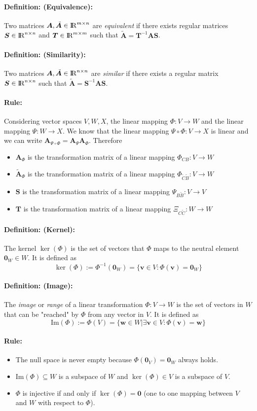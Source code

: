 \documentclass[12pt]{article}
\newcommand{\R}{{\rm I\!R}}
\newcommand{\A}{{\bm{A}}}
\newcommand{\xdefinition}[2]{\paragraph{\colorbox{#1!30}{\textbf{Definition:}} (#2):}}
\newcommand{\xrule}[1]{\paragraph{\colorbox{#1!30}{\textbf{Rule:}}}}
\begin{document}
\xdefinition{blue}{Equivalence} Two matrices $\A, \tilde{\A} \in \R^{m \times n}$ are \textit{equivalent} if there exists regular matrices $\bm{S} \in \R^{n \times n}$ and $\bm{T} \in \R^{m \times m}$ such that $\tilde{\bm{A}} = \bm{T}^{-1} \A \bm{S}$.

\xdefinition{blue}{Similarity} Two matrices $\A, \tilde{\A} \in \R^{n \times n}$ are \textit{similar} if there exists a regular matrix $\bm{S} \in \R^{n \times n}$ such that $\tilde{\bm{A}} = \bm{S}^{-1} \A \bm{S}$. 

\xrule{red} Considering vector spaces $V, W, X$, the linear mapping $\Phi : V \rightarrow W$ and the linear mapping $\Psi : W \rightarrow X$. We know that the linear mapping $\Psi \circ \Phi : V \rightarrow X$ is linear and we can write $\A_{\Psi \circ \Phi} = \A_\Psi \A_\Phi$. Therefore
%
\begin{itemize}
	\item $\A_\Phi$ is the transformation matrix of a linear mapping $\Phi_{CB} : V \rightarrow W$
	\item $\tilde{\A}_\Phi$ is the transformation matrix of a linear mapping $\Phi_{\tilde{C}\tilde{B}} : V \rightarrow W$
	\item $\bm{S}$ is the transformation matrix of a linear mapping $\Psi_{B\tilde{B}} : V \rightarrow V$
	\item $\bm{T}$ is the transformation matrix of a linear mapping $\Xi_{C\tilde{C}} : W \rightarrow W$
\end{itemize}

\xdefinition{blue}{Kernel} The kernel $\ker(\Phi)$ is the set of vectors that $\Phi$ maps to the neutral element $\bm{0}_W \in W$. It is defined as
%
\begin{equation}
	\ker(\Phi) := \Phi^{-1}(\bm{0}_W) = \{\bm{v} \in V : \Phi(\bm{v} ) = \bm{0}_W\}
\end{equation}

\xdefinition{blue}{Image} The \textit{image} or \textit{range} of a linear transformation $\Phi : V \rightarrow W$ is the set of vectors in $W$ that can be "reached" by $\Phi$ from any vector in $V$. It is defined as
%
\begin{equation}
	\text{Im}(\Phi) := \Phi(V) = \{\bm{w} \in W | \exists \bm{v} \in V : \Phi(\bm{v}) = \bm{w}\}
\end{equation}

\xrule{red}
%
\begin{itemize}
	\item The null space is never empty because $\Phi(\bm{0}_V) = \bm{0}_W$ always holds.
	\item $\text{Im}(\Phi) \subseteq W$ is a subspace of $W$ and $\ker(\Phi) \in V$ is a subspace of $V$.
	\item $\Phi$ is injective if and only if $\ker(\Phi) = \bm{0}$ (one to one mapping between $V$ and $W$ with respect to $\Phi$).
\end{itemize}
\end{document}
